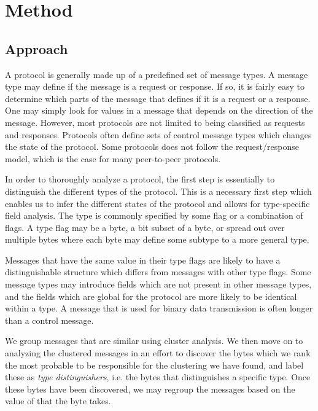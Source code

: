 \documentclass[a4paper]{report}
\begin{document}
\chapter{Method}

\section{Approach}
A protocol is generally made up of a predefined set of message types. A
message type may define if the message is a request or response. If so, it is
fairly easy to determine which parts of the message that defines if it is a
request or a response. One may simply look for values in a message that depends
on the direction of the message. However, most protocols are not limited to
being classified as requests and responses. Protocols often define sets of
control message types which changes the state of the protocol. Some protocols
does not follow the request/response model, which is the case for many
peer-to-peer protocols.

In order to thoroughly analyze a protocol, the first step is essentially to
distinguish the different types of the protocol. This is a necessary first
step which enables us to infer the different states of the protocol and allows
for type-specific field analysis. The type is commonly specified by some flag
or a combination of flags. A type flag may be a byte, a bit subset of a byte,
or spread out over multiple bytes where each byte may define some subtype to a
more general type.

Messages that have the same value in their type flags are likely to have a
distinguishable structure which differs from messages with other type flags.
Some message types may introduce fields which are not present in other
message types, and the fields which are global for the protocol are more
likely to be identical within a type. A message that is used for binary data
transmission is often longer than a control message.

We group messages that are similar using cluster analysis. We then move on to
analyzing the clustered messages in an effort to discover the bytes which we
rank the most probable to be responsible for the clustering we have found, and
label these as \emph{type distinguishers}, i.e. the bytes that distinguishes a
specific type. Once these bytes have been discovered, we may regroup the
messages based on the value of that the byte takes.
\end{document}
